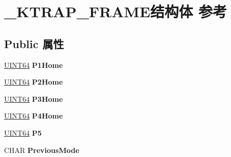 \hypertarget{struct___k_t_r_a_p___f_r_a_m_e}{}\section{\+\_\+\+K\+T\+R\+A\+P\+\_\+\+F\+R\+A\+M\+E结构体 参考}
\label{struct___k_t_r_a_p___f_r_a_m_e}
\subsection*{Public 属性}
\begin{DoxyCompactItemize}
\item 
\mbox{\label{struct___k_t_r_a_p___f_r_a_m_e_aae29fcc9af680d92633f060c27ef7a41}} 
\hyperlink{_processor_bind_8h_a57be03562867144161c1bfee95ca8f7c}{U\+I\+N\+T64} {\bfseries P1\+Home}
\item 
\mbox{\label{struct___k_t_r_a_p___f_r_a_m_e_a49df1c93cdc4bf8fa7d6dc0a2a92b79f}} 
\hyperlink{_processor_bind_8h_a57be03562867144161c1bfee95ca8f7c}{U\+I\+N\+T64} {\bfseries P2\+Home}
\item 
\mbox{\label{struct___k_t_r_a_p___f_r_a_m_e_aa763c29f4cb5c99e13cfef16ffe41048}} 
\hyperlink{_processor_bind_8h_a57be03562867144161c1bfee95ca8f7c}{U\+I\+N\+T64} {\bfseries P3\+Home}
\item 
\mbox{\label{struct___k_t_r_a_p___f_r_a_m_e_a5c4407351ace20a62681aeb039fa3467}} 
\hyperlink{_processor_bind_8h_a57be03562867144161c1bfee95ca8f7c}{U\+I\+N\+T64} {\bfseries P4\+Home}
\item 
\mbox{\label{struct___k_t_r_a_p___f_r_a_m_e_a3920cb5f210a095e3a01617974083217}} 
\hyperlink{_processor_bind_8h_a57be03562867144161c1bfee95ca8f7c}{U\+I\+N\+T64} {\bfseries P5}
\item 
\mbox{\label{struct___k_t_r_a_p___f_r_a_m_e_a309c81802f3b892174c8a85ce60d8ad0}} 
C\+H\+AR {\bfseries Previous\+Mode}
\item 
\mbox{\label{struct___k_t_r_a_p___f_r_a_m_e_a90e9ec5e85b9e232ca1e9f55b6554c32}} 

\end{DoxyCompactItemize}
